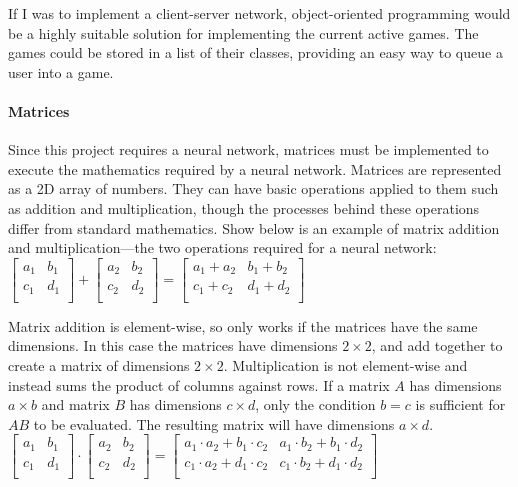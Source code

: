 \documentclass{article}
\begin{document}
If I was to implement a client-server network, object-oriented programming would be a highly suitable solution for implementing the current active games. The games could be stored in a list of their classes, providing an easy way to queue a user into a game.

\paragraph{Matrices\\}

Since this project requires a neural network, matrices must be implemented to execute the mathematics required by a neural network. Matrices are represented as a 2D array of numbers. They can have basic operations applied to them such as addition and multiplication, though the processes behind these operations differ from standard mathematics. Show below is an example of matrix addition and multiplication---the two operations required for a neural network: \\

\(\begin{bmatrix}
    a_1 & b_1 \\
    c_1 & d_1 \\
\end{bmatrix}
+
\begin{bmatrix}
    a_2 & b_2 \\
    c_2 & d_2 \\
\end{bmatrix}
=
\begin{bmatrix}
    a_1+a_2 & b_1+b_2 \\
    c_1+c_2 & d_1+d_2 \\
\end{bmatrix}\)

\vspace{1em}
Matrix addition is element-wise, so only works if the matrices have the same dimensions. In this case the matrices have dimensions \(2\times 2\), and add together to create a matrix of dimensions \(2\times 2\). Multiplication is not element-wise and instead sums the product of columns against rows. If a matrix \(A\) has dimensions \(a\times b\) and matrix \(B\) has dimensions \(c\times d\), only the condition \(b=c\) is sufficient for \(AB\) to be evaluated. The resulting matrix will have dimensions \(a\times d\). \\

\(\begin{bmatrix}
    a_1 & b_1 \\
    c_1 & d_1 \\
\end{bmatrix}
\cdot
\begin{bmatrix}
    a_2 & b_2 \\
    c_2 & d_2 \\
\end{bmatrix}
=
\begin{bmatrix}
    a_1\cdot a_2+b_1\cdot c_2 & a_1\cdot b_2+b_1\cdot d_2 \\
    c_1\cdot a_2+d_1\cdot c_2 & c_1\cdot b_2+d_1\cdot d_2 \\
\end{bmatrix}\)
\end{document}
